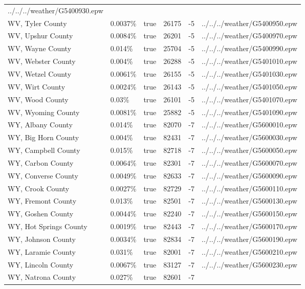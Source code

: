 \begin{longtable}[]{@{}llllll@{}}
../../../weather/G5400930.epw \\
WV, Tyler County & 0.0037\% & true & 26175 & -5 &
../../../weather/G5400950.epw \\
WV, Upshur County & 0.0084\% & true & 26201 & -5 &
../../../weather/G5400970.epw \\
WV, Wayne County & 0.014\% & true & 25704 & -5 &
../../../weather/G5400990.epw \\
WV, Webster County & 0.004\% & true & 26288 & -5 &
../../../weather/G5401010.epw \\
WV, Wetzel County & 0.0061\% & true & 26155 & -5 &
../../../weather/G5401030.epw \\
WV, Wirt County & 0.0024\% & true & 26143 & -5 &
../../../weather/G5401050.epw \\
WV, Wood County & 0.03\% & true & 26101 & -5 &
../../../weather/G5401070.epw \\
WV, Wyoming County & 0.0081\% & true & 25882 & -5 &
../../../weather/G5401090.epw \\
WY, Albany County & 0.014\% & true & 82070 & -7 &
../../../weather/G5600010.epw \\
WY, Big Horn County & 0.004\% & true & 82431 & -7 &
../../../weather/G5600030.epw \\
WY, Campbell County & 0.015\% & true & 82718 & -7 &
../../../weather/G5600050.epw \\
WY, Carbon County & 0.0064\% & true & 82301 & -7 &
../../../weather/G5600070.epw \\
WY, Converse County & 0.0049\% & true & 82633 & -7 &
../../../weather/G5600090.epw \\
WY, Crook County & 0.0027\% & true & 82729 & -7 &
../../../weather/G5600110.epw \\
WY, Fremont County & 0.013\% & true & 82501 & -7 &
../../../weather/G5600130.epw \\
WY, Goshen County & 0.0044\% & true & 82240 & -7 &
../../../weather/G5600150.epw \\
WY, Hot Springs County & 0.0019\% & true & 82443 & -7 &
../../../weather/G5600170.epw \\
WY, Johnson County & 0.0034\% & true & 82834 & -7 &
../../../weather/G5600190.epw \\
WY, Laramie County & 0.031\% & true & 82001 & -7 &
../../../weather/G5600210.epw \\
WY, Lincoln County & 0.0067\% & true & 83127 & -7 &
../../../weather/G5600230.epw \\
WY, Natrona County & 0.027\% & true & 82601 & -7 &

\end{longtable}

